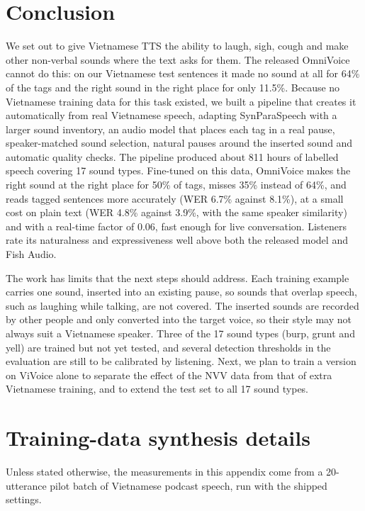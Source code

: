 \documentclass{article} %
\begin{document}
\section{Conclusion}\label{sec:conclusion}
We set out to give Vietnamese TTS the ability to laugh, sigh, cough and make other non-verbal
sounds where the text asks for them. The released OmniVoice cannot do this: on our Vietnamese
test sentences it made no sound at all for 64\% of the tags and the right sound in the right
place for only 11.5\%. Because no Vietnamese training data for this task existed, we built a
pipeline that creates it automatically from real Vietnamese speech, adapting SynParaSpeech with
a larger sound inventory, an audio model that places each tag in a real pause, speaker-matched
sound selection, natural pauses around the inserted sound and automatic quality checks. The
pipeline produced about 811 hours of labelled speech covering 17 sound types. Fine-tuned on this
data, OmniVoice makes the right sound at the right place for 50\% of tags, misses 35\% instead of
64\%, and reads tagged sentences more accurately (WER 6.7\% against 8.1\%), at a small cost on plain
text (WER 4.8\% against 3.9\%, with the same speaker similarity) and with a real-time factor of
0.06, fast enough for live conversation. Listeners rate its naturalness and expressiveness well
above both the released model and Fish Audio.

The work has limits that the next steps should address. Each training example carries one sound,
inserted into an existing pause, so sounds that overlap speech, such as laughing while talking,
are not covered. The inserted sounds are recorded by other people and only converted into the
target voice, so their style may not always suit a Vietnamese speaker. Three of the 17 sound
types (burp, grunt and yell) are trained but not yet tested, and several detection thresholds
in the evaluation are still to be calibrated by listening. Next, we plan to train a version on
ViVoice alone to separate the effect of the NVV data from that of extra Vietnamese training, and to
extend the test set to all 17 sound types.




\appendix

\section{Training-data synthesis details}\label{app:data}
Unless stated otherwise, the measurements in this appendix come from a 20-utterance pilot batch
of Vietnamese podcast speech, run with the shipped settings.
\end{document}
